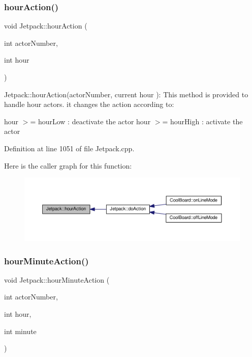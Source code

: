 \subsubsection{\texorpdfstring{hour\+Action()}{hourAction()}}
{\footnotesize\ttfamily void Jetpack\+::hour\+Action (\begin{DoxyParamCaption}\item[{int}]{actor\+Number,  }\item[{int}]{hour }\end{DoxyParamCaption})}

Jetpack\+::hour\+Action(actor\+Number, current hour )\+: This method is provided to handle hour actors. it changes the action according to\+:

hour $>$= hour\+Low \+: deactivate the actor hour $>$= hour\+High \+: activate the actor 

Definition at line 1051 of file Jetpack.\+cpp.

Here is the caller graph for this function\+:\nopagebreak
\begin{figure}[H]
\begin{center}
\leavevmode
\includegraphics[width=350pt]{class_jetpack_acd6889af2fe5b057c6bd51b6dac827ef_icgraph}
\end{center}
\end{figure}
\mbox{\label{class_jetpack_ae01c13c785ebdf1b0bb5500234aba1bd}} 
\subsubsection{\texorpdfstring{hour\+Minute\+Action()}{hourMinuteAction()}}
{\footnotesize\ttfamily void Jetpack\+::hour\+Minute\+Action (\begin{DoxyParamCaption}\item[{int}]{actor\+Number,  }\item[{int}]{hour,  }\item[{int}]{minute }\end{DoxyParamCaption})}

